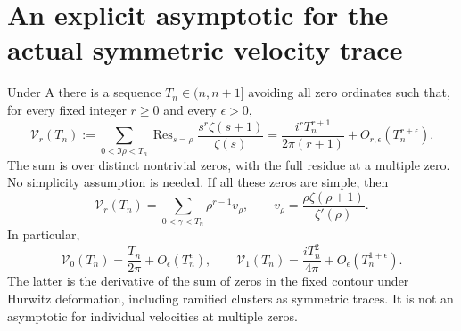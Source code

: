 \section{An explicit asymptotic for the actual symmetric velocity trace}

\begin{theorem}
Under A there is a sequence $T_n\in(n,n+1]$ avoiding all zero ordinates
such that, for every fixed integer $r\ge0$ and every $\epsilon>0$,
\[
 \mathcal V_r(T_n):=
 \sum_{0<\Im\rho<T_n}
 \operatorname{Res}_{s=\rho}
 \frac{s^r\zeta(s+1)}{\zeta(s)}
 =\frac{i^rT_n^{r+1}}{2\pi(r+1)}
 +O_{r,\epsilon}(T_n^{r+\epsilon}).
\]
The sum is over distinct nontrivial zeros, with the full residue at a
multiple zero. No simplicity assumption is needed. If all these zeros
are simple, then
\[
 \mathcal V_r(T_n)=\sum_{0<\gamma<T_n}\rho^{r-1}v_\rho,
 \qquad v_\rho=\frac{\rho\zeta(\rho+1)}{\zeta'(\rho)}.
\]
In particular,
\[
 \mathcal V_0(T_n)=\frac{T_n}{2\pi}+O_\epsilon(T_n^\epsilon),
 \qquad
 \mathcal V_1(T_n)=\frac{iT_n^2}{4\pi}
 +O_\epsilon(T_n^{1+\epsilon}).
\]
The latter is the derivative of the sum of zeros in the fixed contour
under Hurwitz deformation, including ramified clusters as symmetric
traces. It is not an asymptotic for individual velocities at multiple
zeros.
\end{theorem}
